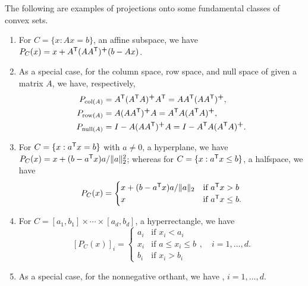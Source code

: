 \begin{Example}
\label{xa:projection_mappings}
The following are examples of projections onto some fundamental classes of
convex sets.

\begin{enumerate}[label=\alph*., ref=\alph*]
\item For $C = \{x : Ax = b\}$, an affine subspace, we have $P_C(x) = x + A^{\mathsf{T}}
  (A A^{\mathsf{T}})^{\bm{+}} (b - Ax)$.  

\item {}
  As a special case, for the column space, row space, and null space of given a
  matrix $A$, we have, respectively,  
  \begin{align*}
  P_{\operatorname{col}(A)} &= A^{\mathsf{T}} (A^{\mathsf{T}} A)^{\bm{+}} A^{\mathsf{T}} = A A^{\mathsf{T}} (A A^{\mathsf{T}})^{\bm{+}}, \\
  P_{\operatorname{row}(A)} &= A (A A^{\mathsf{T}})^{\bm{+}} A = A^{\mathsf{T}} A (A^{\mathsf{T}} A)^{\bm{+}}, \\
  P_{\operatorname{null}(A)} &= I - A (A A^{\mathsf{T}})^{\bm{+}} A = I - A^{\mathsf{T}} A (A^{\mathsf{T}} A)^{\bm{+}}.
  \end{align*}

\item For $C = \{x : a^{\mathsf{T}} x = b\}$ with $a \not= 0$, a hyperplane, we have
  $P_C(x) = x + (b - a^{\mathsf{T}} x) a / \|a\|_2^2$; whereas for $C = \{x : a^{\mathsf{T}} x \leq 
  b\}$, a halfspace, we have   
  \[
  P_C(x) = 
  \begin{cases}
  x + (b - a^{\mathsf{T}} x) a / \|a\|_2 & \text{if $a^{\mathsf{T}} x > b$} \\
  x & \text{if $a^{\mathsf{T}} x \leq b$}.
  \end{cases}
  \]

\item For $C = [a_1, b_1] \times \cdots \times [a_d, b_d]$, a hyperrectangle, we
  have  
  \[
  [P_C(x)]_i = 
  \begin{cases}
  a_i & \text{if $x_i < a_i$} \\
  x_i & \text{if $a \leq x_i \leq b$} \\
  b_i & \text{if $x_i > b_i$}
  \end{cases},
  \quad i = 1,\dots,d.
  \]

\item As a special case, for the nonnegative orthant, we have
  , $i=1,\dots,d$.  


\end{enumerate}
\end{Example}
